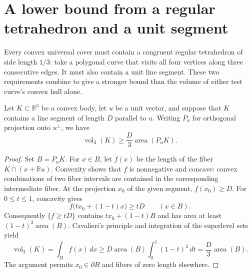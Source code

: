 \section{A lower bound from a regular tetrahedron and a unit segment}\label{sec:tetra}

Every convex universal cover must contain a congruent regular tetrahedron
of side length $1/3$: take a polygonal curve that visits all four vertices
along three consecutive edges.  It must also contain a unit line segment.
These two requirements combine to give a stronger bound than the volume
of either test curve's convex hull alone.

\begin{lemma}\label{lem:fiber}
Let $K\subset\mathbb R^3$ be a convex body, let $u$ be a unit vector,
and suppose that $K$ contains a line segment of length $D$ parallel to $u$.
Writing $P_u$ for orthogonal projection onto $u^\perp$, we have
\[
 \operatorname{vol}_3(K)\geq
 \frac{D}{3}\operatorname{area}(P_uK).
\]
\end{lemma}
\begin{proof}
Set $B=P_uK$.  For $x\in B$, let $f(x)$ be the length of the fiber
$K\cap(x+\mathbb Ru)$.  Convexity shows that $f$ is nonnegative and
concave: convex combinations of two fiber intervals are contained in the
corresponding intermediate fiber.  At the projection $x_0$ of the given
segment, $f(x_0)\ge D$.  For $0\leq t\leq1$, concavity gives
\[
 f\bigl(t x_0+(1-t)x\bigr)\geq tD\qquad(x\in B).
\]
Consequently $\{f\geq tD\}$ contains $t x_0+(1-t)B$ and has area
at least $(1-t)^2\operatorname{area}(B)$.  Cavalieri's principle and
integration of the superlevel sets yield
\[
 \operatorname{vol}_3(K)=\int_B f(x)\,dx
 \geq D\operatorname{area}(B)\int_0^1(1-t)^2\,dt
 =\frac D3\operatorname{area}(B).
\]
The argument permits $x_0\in\partial B$ and fibers of zero length elsewhere.
\end{proof}

